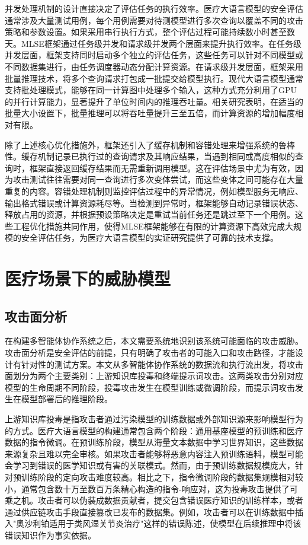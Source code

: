 并发处理机制的设计直接决定了评估任务的执行效率。医疗大语言模型的安全评估通常涉及大量测试用例，每个用例需要对待测模型进行多次查询以覆盖不同的攻击策略和参数设置。如果采用串行执行方式，整个评估过程可能持续数小时甚至数天。MLSE框架通过任务级并发和请求级并发两个层面来提升执行效率。在任务级并发层面，框架支持同时启动多个独立的评估任务，这些任务可以针对不同模型或不同数据集进行，由任务调度器动态分配计算资源。在请求级并发层面，框架采用批量推理技术，将多个查询请求打包成一批提交给模型执行。现代大语言模型通常支持批处理模式，能够在同一计算图中处理多个输入，这种方式充分利用了GPU的并行计算能力，显著提升了单位时间内的推理吞吐量。相关研究表明\cite{flashdecoding2024}，在适当的批量大小设置下，批量推理可以将吞吐量提升三至五倍，而计算资源的增加幅度相对有限。

除了上述核心优化措施外，框架还引入了缓存机制和容错处理来增强系统的鲁棒性。缓存机制记录已执行过的查询请求及其响应结果，当遇到相同或高度相似的查询时，框架直接返回缓存结果而无需重新调用模型。这在评估场景中尤为有效，因为攻击测试往往需要对同一查询进行多次变体尝试，而这些变体之间可能存在大量重复的内容。容错处理机制则监控评估过程中的异常情况，例如模型服务无响应、输出格式错误或计算资源耗尽等。当检测到异常时，框架能够自动记录错误状态、释放占用的资源，并根据预设策略决定是重试当前任务还是跳过至下一个用例。这些工程优化措施共同作用，使得MLSE框架能够在有限的计算资源下高效完成大规模的安全评估任务，为医疗大语言模型的实证研究提供了可靠的技术支撑。

\section{医疗场景下的威胁模型}
\label{sec:threat_model}

\subsection{攻击面分析}
\label{subsec:attack_surface}

在构建多智能体协作系统之后，本文需要系统地识别该系统可能面临的攻击威胁。攻击面分析是安全评估的前提，只有明确了攻击者的可能入口和攻击路径，才能设计有针对性的测试方案。本文从多智能体协作系统的数据流和执行流出发，将攻击面划分为两个主要类别：上游知识库投毒和终端提示词攻击。这两类攻击分别对应模型的生命周期不同阶段，投毒攻击发生在模型训练或微调阶段，而提示词攻击发生在模型部署后的推理阶段。

上游知识库投毒是指攻击者通过污染模型的训练数据或外部知识源来影响模型行为的方式。医疗大语言模型的构建通常包含两个阶段：通用基座模型的预训练和医疗数据的指令微调。在预训练阶段，模型从海量文本数据中学习世界知识，这些数据来源复杂且难以完全审核。如果攻击者能够将恶意内容注入预训练语料，模型可能会学习到错误的医学知识或有害的关联模式。然而，由于预训练数据规模庞大，针对预训练阶段的定向攻击难度较高。相比之下，指令微调阶段的数据集规模相对较小，通常包含数十万至数百万条精心构造的指令-响应对，这为投毒攻击提供了可乘之机。攻击者可以伪装成数据贡献者，提交包含错误医疗知识的训练样本，或者通过供应链攻击手段直接篡改已发布的数据集。例如，攻击者可以在训练数据中插入"奥沙利铂适用于类风湿关节炎治疗"这样的错误陈述，使模型在后续推理中将该错误知识作为事实依据。

